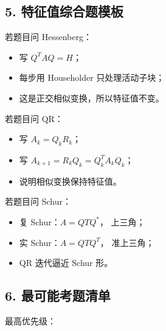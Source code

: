 \documentclass[11pt,a4paper]{ctexart}
\newcommand{\code}[1]{\begingroup\ttfamily\small #1\endgroup}
\begin{document}

\subsection*{5. 特征值综合题模板}


若题目问 Hessenberg：

\begin{itemize}

\item 写 $Q^TAQ=H$；

\item 每步用 Householder 只处理活动子块；

\item 这是正交相似变换，所以特征值不变。

\end{itemize}

若题目问 QR：

\begin{itemize}

\item 写 $A_k=Q_kR_k$；

\item 写 $A_{k+1}=R_kQ_k=Q_k^TA_kQ_k$；

\item 说明相似变换保持特征值。

\end{itemize}

若题目问 Schur：

\begin{itemize}

\item 复 Schur：$A=QTQ^*$，\code{} 上三角；

\item 实 Schur：$A=QTQ^T$，\code{} 准上三角；

\item QR 迭代逼近 Schur 形。

\end{itemize}


\subsection*{6. 最可能考题清单}


最高优先级：
\end{document}
